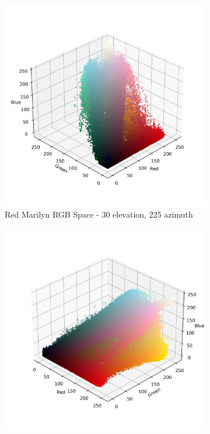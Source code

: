 \documentclass{article}
\begin{document}
\begin{figure}[ht]\ContinuedFloat
  \centering
  \begin{subfigure}{0.45\textwidth}
    \includegraphics[width=\textwidth]{main_files/figure-latex/4_7_red_marilyn_original_scatter.jpg}
    \caption{Red Marilyn RGB Space - 30 \degree elevation, 225 \degree azimuth}
    \label{fig:4_7_red_marilyn_original_scatter}
  \end{subfigure}
  \hfill
  \begin{subfigure}{0.45\textwidth}
    \includegraphics[width=\textwidth]{main_files/figure-latex/4_8_red_marilyn_original_scatter.jpg}

\end{subfigure}
\end{figure}
\end{document}

